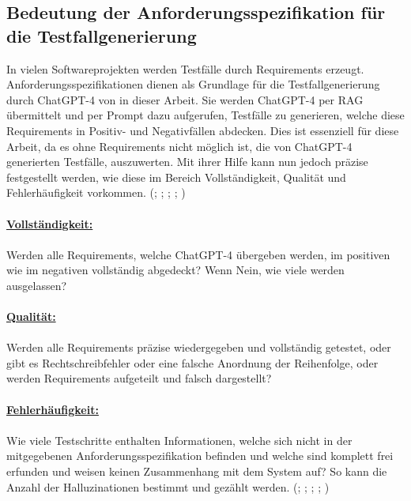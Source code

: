 \documentclass[12pt,toc=bib,toc=listof]{scrreprt}
\begin{document}
\subsection{Bedeutung der Anforderungsspezifikation für die Testfallgenerierung} %
\label{sec:bedeutungDerAnforderungsspezifikationFürDieTestfallgenerierung}
In vielen Softwareprojekten werden Testfälle durch Requirements erzeugt. Anforderungsspezifikationen dienen als Grundlage für die Testfallgenerierung durch ChatGPT-4 von \textcite{OpenAI2025} in dieser Arbeit. Sie werden ChatGPT-4 per RAG übermittelt und per Prompt dazu aufgerufen, Testfälle zu generieren, welche diese Requirements in Positiv- und Negativfällen abdecken. Dies ist essenziell für diese Arbeit, da es ohne Requirements nicht möglich ist, die von ChatGPT-4 generierten Testfälle, auszuwerten. Mit ihrer Hilfe kann nun jedoch präzise festgestellt werden, wie diese im Bereich Vollständigkeit, Qualität und Fehlerhäufigkeit vorkommen. (\cite{Aysolmaz2018}; \cite{Barmi2011}; \cite{JamaSoftware2024}; \cite{Mustafa2021}; \cite{Visure2024})\\
\\
\textbf{\underline{Vollständigkeit:}}\\
\\
Werden alle Requirements, welche ChatGPT-4 übergeben werden, im positiven wie im negativen vollständig abgedeckt? Wenn Nein, wie viele werden ausgelassen?\\
\\
\textbf{\underline{Qualität:}}\\
\\
Werden alle Requirements präzise wiedergegeben und vollständig getestet, oder gibt es Rechtschreibfehler oder eine falsche Anordnung der Reihenfolge, oder werden Requirements aufgeteilt und falsch dargestellt?\\
\\
\textbf{\underline{Fehlerhäufigkeit:}}\\
\\
Wie viele Testschritte enthalten Informationen, welche sich nicht in der mitgegebenen Anforderungsspezifikation befinden und welche sind komplett frei erfunden und weisen keinen Zusammenhang mit dem System auf? So kann die Anzahl der Halluzinationen bestimmt und gezählt werden. (\cite{Aysolmaz2018}; \cite{Barmi2011}; \cite{JamaSoftware2024}; \cite{Mustafa2021}; \cite{Visure2024})
\end{document}
